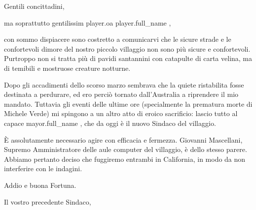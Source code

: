 \documentclass{letter}
\date{18 novembre 2014}
\begin{document}
\begin{letter}{}
\opening{Gentili concittadini,}

ma soprattutto gentilissim{{ player.oa }} {{ player.full_name }},

con sommo dispiacere sono costretto a comunicarvi che le sicure strade e le confortevoli dimore del nostro piccolo villaggio non sono più sicure e confortevoli.
Purtroppo non si tratta più di pavidi santannini con catapulte di carta velina, ma di temibili e mostruose creature notturne.

Dopo gli accadimenti dello scorso marzo sembrava che la quiete ristabilita fosse destinata a perdurare, ed ero perciò tornato dall'Australia a riprendere il mio mandato.
Tuttavia gli eventi delle ultime ore (specialmente la prematura morte di Michele Verde) mi spingono a un altro atto di eroico sacrificio: lascio tutto al capace {{ mayor.full_name }}, che da oggi è il nuovo Sindaco del villaggio.

È assolutamente necessario agire con efficacia e fermezza.
Giovanni Mascellani, Supremo Amministratore delle aule computer del villaggio, è dello stesso parere. Abbiamo pertanto deciso che fuggiremo entrambi in California, in modo da non interferire con le indagini.

Addio e buona Fortuna.

\closing{Il vostro precedente Sindaco,}

\end{letter}
\end{document}

